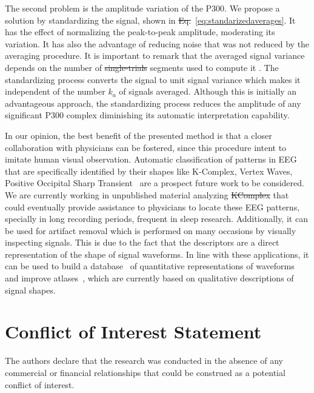 \documentclass[utf8]{frontiersSCNS} %
\providecommand{\DIFaddtex}[1]{{\protect\color{blue}\uwave{#1}}} %
\providecommand{\DIFdeltex}[1]{{\protect\color{red}\sout{#1}}}                      %
\providecommand{\DIFaddbegin}{} %
\providecommand{\DIFaddend}{} %
\providecommand{\DIFdelbegin}{} %
\providecommand{\DIFdelend}{} %
\providecommand{\DIFadd}[1]{\texorpdfstring{\DIFaddtex{#1}}{#1}} %
\providecommand{\DIFdel}[1]{\texorpdfstring{\DIFdeltex{#1}}{}} %
\begin{document}
The second problem is the amplitude variation of the P300. We propose a solution by standardizing the signal, shown in \DIFdelbegin \DIFdel{Eq.}\DIFdelend \DIFaddbegin \DIFadd{Equation}\DIFaddend ~\ref{eq:standarizedaverages}. It has the effect of normalizing the peak-to-peak amplitude, moderating its variation. It has also the advantage of reducing noise that was not reduced by the averaging procedure.   It is important to remark that the averaged signal variance depends on the number of \DIFdelbegin \DIFdel{single-trials }\DIFdelend segments used to compute it \citep{van2006signal}.  The standardizing process converts the signal to unit signal variance which makes it independent of the number $k_a$ of signals averaged.   Although this is initially an advantageous approach, the standardizing process reduces the amplitude of any significant P300 complex diminishing its automatic interpretation capability.

In our opinion, the best benefit of the presented method is that a closer collaboration with physicians can be fostered, since this procedure intent to imitate human visual observation.  Automatic classification of patterns in EEG that are specifically identified by their shapes like K-Complex, Vertex Waves, Positive Occipital Sharp Transient~\citep{Hartman2005} are a prospect future work to be considered. We are currently working in unpublished material analyzing \DIFdelbegin \DIFdel{KComplex }\DIFdelend \DIFaddbegin \DIFadd{K-Complex components }\DIFaddend that could eventually provide  assistance to physicians to locate these EEG patterns, specially in long recording periods, frequent in sleep research.  
Additionally, it can be used for artifact removal which is performed on many occasions by visually inspecting signals.  This is due to the fact that the descriptors are a direct representation of the shape of signal waveforms. In line with these applications,  it can be used to build a database~\citep{Chavarriaga2017} of quantitative representations of waveforms and improve atlases~\citep{Hartman2005}, which are currently based on qualitative descriptions of signal shapes.

\section*{Conflict of Interest Statement}
The authors declare that the research was conducted in the absence of any commercial or financial relationships that could be construed as a potential conflict of interest.
\end{document}
